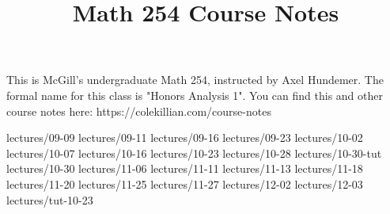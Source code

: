 \documentclass{scrartcl}
\title{Math 254 Course Notes}
\begin{document}
\maketitle

This is McGill’s undergraduate Math 254, instructed by Axel Hundemer. The formal name for this class is "Honors Analysis 1". You can find this and other course notes here: https://colekillian.com/course-notes

\tableofcontents



{lectures/09-09}
{lectures/09-11}
{lectures/09-16}
{lectures/09-23}
{lectures/10-02}
{lectures/10-07}
{lectures/10-16}
{lectures/10-23}
{lectures/10-28}
{lectures/10-30-tut}
{lectures/10-30}
{lectures/11-06}
{lectures/11-11}
{lectures/11-13}
{lectures/11-18}
{lectures/11-20}
{lectures/11-25}
{lectures/11-27}
{lectures/12-02}
{lectures/12-03}
{lectures/tut-10-23}
\end{document}

